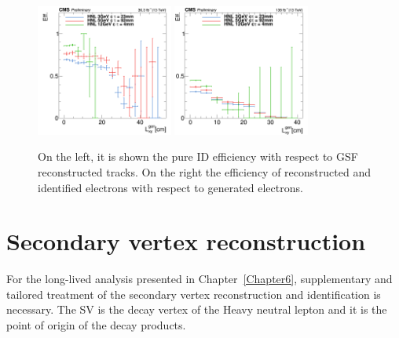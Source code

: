 \begin{figure}[h]
\centering
  \includegraphics[width=0.4\textwidth]{Figures/c2/_e_l2id_Lxy_eff.png}
  \includegraphics[width=0.4\textwidth]{Figures/c2/el_l2full_Lxy_eff.png}
  \caption{On the left, it is shown the pure ID efficiency with
    respect to GSF reconstructed tracks. On the right the efficiency
    of reconstructed and identified electrons with
    respect to generated electrons. \basile}
  \label{fig:basileele}
\end{figure}



\section{Secondary vertex reconstruction} \label{sec:c2sv}

For the long-lived analysis presented in
Chapter~\ref{Chapter6}, supplementary and
tailored treatment of the secondary vertex reconstruction and
identification is necessary. The SV is the decay vertex of the Heavy
neutral lepton and it is the point of origin of the decay products.\\

